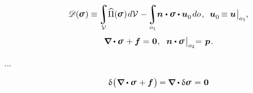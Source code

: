 \nopagebreak
\begin{equation}\label{thecomplementaryenergyfunctional}
\complementaryenergyfunctional (\hspace{-0.1ex}\linearstress\hspace{.1ex})
\equiv \hspace{-0.2ex}
\displaystyle \integral\displaylimits_{\mathcal{V}} \hspace{-0.5ex}
\widehat{\potentialenergydensity}(\hspace{-0.1ex}\linearstress\hspace{.1ex}) \hspace{.2ex} d\mathcal{V} \hspace{.1ex}
- \hspace{-0.2ex}
\displaystyle\integral\displaylimits_{o_1} \hspace{-0.5ex}
\unitnormalvector \hspace{.1ex} \dotp \linearstress \dotp \bm{u}_{\raisemath{-0.1em}{0}} \hspace{.25ex} do
\hspace{.2ex} ,
\hspace{.5em}
\bm{u}_{\raisemath{-0.1em}{0}} \hspace{-0.2ex} \equiv \bm{u} \hspace{.1ex} \bigr|_{o_1}
\hspace{-0.1ex} ,
\end{equation}
%
\nopagebreak\vspace{-0.4em}\begin{equation*}
\boldnabla \dotp \linearstress \hspace{.15ex} + \bm{f} = \hspace{.1ex} \zerovector \hspace{.1ex} ,
\hspace{.6em}
\unitnormalvector \dotp \linearstress \hspace{.2ex} \bigr|_{o_2} \hspace{-0.66ex} = \hspace{.2ex} \bm{p}
\hspace{.2ex} .
\end{equation*}

...


\noindent
\begin{equation*}\label{the variation of the balance of force equation}
\variation{\hspace{.1ex} \bigl( \hspace{.1ex}
\boldnabla \dotp \linearstress
\hspace{.15ex} +
\bm{f}
\hspace{.15ex} \bigr)} \hspace{-0.2ex}
= \hspace{-0.1ex}
\boldnabla \dotp \variation{\linearstress} \hspace{.15ex}
= \hspace{.1ex} \zerovector
\end{equation*}

